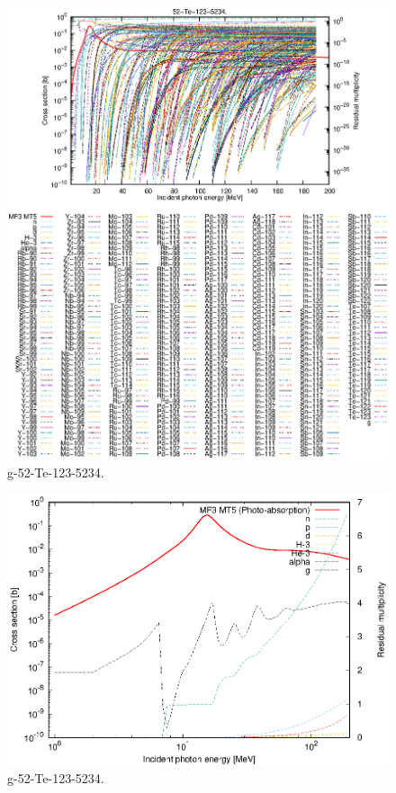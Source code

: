 \begin{figure}
 \includegraphics[width=\linewidth]{eps/g_52-Te-123_5234.eps}
  \caption{g-52-Te-123-5234.}
\end{figure}
\newpage \clearpage

\begin{figure}
 \includegraphics[width=\linewidth]{eps-log/g_52-Te-123_5234.eps}
 \caption{g-52-Te-123-5234.}
\end{figure}
\newpage \clearpage

